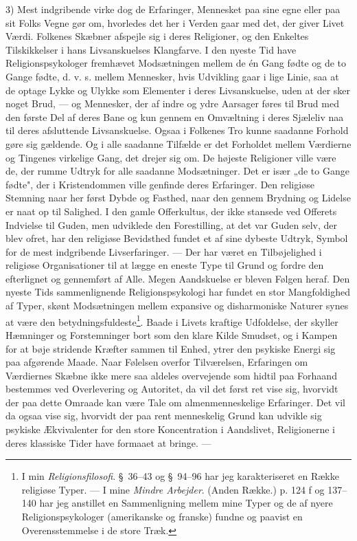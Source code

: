 \documentclass[12pt,a4paper]{book}
\newcommand{\apage}[1]{\marginnote{\footnotesize\textit{[#1]}}}
\begin{document}
3) Mest indgribende virke dog de Erfaringer, Mennesket paa sine egne eller paa sit Folks
Vegne gør om, hvorledes det her i Verden gaar med det, der giver Livet Værdi. Folkenes
Skæbner afspejle sig i deres Religioner, og den Enkeltes Tilskikkelser i hans Livsanskuelses
Klangfarve. I den nyeste Tid have Religionspsykologer fremhævet Modsætningen mellem de én Gang
fødte og de to Gange fødte, d. v. s. \apage{388} mellem Mennesker, hvis Udvikling gaar i lige Linie, saa
at de optage Lykke og Ulykke som Elementer i deres Livsanskuelse, uden at der sker noget
Brud, --- og Mennesker, der af indre og ydre Aarsager føres til Brud med den første Del af
deres Bane og kun gennem en Omvæltning i deres Sjæleliv naa til deres afsluttende
Livsanskuelse. Ogsaa i Folkenes Tro kunne saadanne Forhold gøre sig gældende. Og i alle
saadanne Tilfælde er det Forholdet mellem Værdierne og Tingenes virkelige Gang, det drejer
sig om. De højeste Religioner ville være de, der rumme Udtryk for alle saadanne Modsætninger.
Det er især „de to Gange fødte", der i Kristendommen ville genfinde deres Erfaringer. Den
religiøse Stemning naar her først Dybde og Fasthed, naar den gennem Brydning og Lidelse er
naat op til Salighed. I den gamle Offerkultus, der ikke stansede ved Offerets Indvielse til
Guden, men udviklede den Forestilling, at det var Guden selv, der blev ofret, har den
religiøse Bevidsthed fundet et af sine dybeste Udtryk, Symbol for de mest indgribende
Livserfaringer. --- Der har været en Tilbøjelighed i religiøse Organisationer til at lægge en
eneste Type til Grund og fordre den efterlignet og gennemført af Alle. Megen Aandskuelse er
bleven Følgen heraf. Den nyeste Tids sammenlignende Religionspsykologi har fundet en stor
Mangfoldighed af Typer, skønt Modsætningen mellem expansive og disharmoniske Naturer synes at
være den betydningsfuldeste\footnote{I min \emph{Religionsfilosofi}. \S\ 36--43 og \S\ 94--96
har jeg karakteriseret en Række religiøse Typer. --- I mine \emph{Mindre Arbejder}. (Anden Række.) p. 124 f og 137--140 har jeg anstillet en Sammenligning mellem mine Typer og de af
nyere Religionspsykologer (amerikanske og franske) fundne og paavist en Overensstemmelse i de
store Træk.}. Baade i Livets kraftige Udfoldelse, der skyller Hæmninger og Forstemninger bort
som den klare Kilde Smudset, og i Kampen for at bøje stridende Kræfter sammen til Enhed, ytrer
den psykiske Energi sig paa afgørende Maade. Naar Følelsen overfor Tilværelsen, Erfaringen om
Værdiernes Skæbne ikke mere saa aldeles overvejende som hidtil paa Forhaand bestemmes ved
Overlevering og Autoritet, da vil det først ret vise sig, hvorvidt der paa dette Omraade kan
være Tale om almenmenneskelige Erfaringer. Det vil da ogsaa vise sig, hvorvidt \apage{389} der paa rent
menneskelig Grund kan udvikle sig psykiske Ækvivalenter for den store Koncentration i
Aandslivet, Religionerne i deres klassiske Tider have formaaet at bringe. ---
\end{document}
